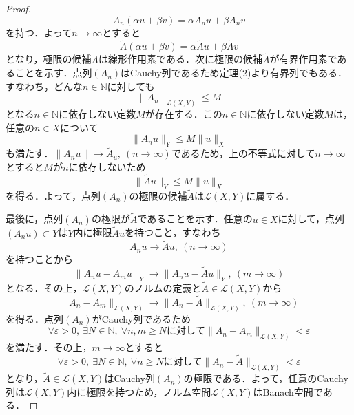 \documentclass[11pt,a4paper,titlepage]{jsreport}
\theoremstyle{definition}
\begin{document}
\begin{proof}
  \begin{equation*}
    A_n(\alpha u+\beta v) = \alpha A_n u + \beta A_n v
  \end{equation*}
  を持つ．よって$n\rightarrow \infty$とすると
  \begin{equation*}
    \tilde{A}(\alpha u+\beta v)=\alpha \tilde{A} u + \beta \tilde{A} v
  \end{equation*}
  となり，極限の候補$\tilde{A}$は線形作用素である．次に極限の候補$\tilde{A}$が有界作用素であることを示す．点列$(A_n)$はCauchy列であるため定理(2)より有界列でもある．すなわち，どんな$n\in \mathbb{N}$に対しても
  \begin{equation*}
    \|A_n\|_{\mathcal{L}(X,Y)} \leq M
  \end{equation*}
  となる$n\in\mathbb{N}$に依存しない定数$M$が存在する．この$n\in\mathbb{N}$に依存しない定数$M$は，任意の$n\in X$について
  \begin{equation*}
    \|A_nu\|_Y \leq M\|u\|_X
  \end{equation*}
  も満たす．$\|A_nu\|\rightarrow\tilde{A}_u,\ (n\rightarrow \infty)$であるため，上の不等式に対して$n\rightarrow \infty$とすると$M$が$n$に依存しないため
  \begin{equation*}
    \|\tilde{A}u\|_Y \leq M\|u\|_X
  \end{equation*}
  を得る．よって，点列$(A_n)$の極限の候補$\tilde{A}$は$\mathcal{L}(X,Y)$に属する．

  最後に，点列$(A_n)$の極限が$\tilde{A}$であることを示す．任意の$u\in X$に対して，点列$(A_nu)\subset Y$は$Y$内に極限$\tilde{A}u$を持つこと，すなわち
  \begin{equation*}
    A_nu\rightarrow \tilde{A}u,\ (n \rightarrow \infty)
  \end{equation*}
  を持つことから
  \begin{equation*}
    \|A_n u- A_m u\|_Y\rightarrow \|A_n u-\tilde{A}u\|_Y,\ (m\rightarrow \infty)
  \end{equation*}
  となる．その上，$\mathcal{L}(X,Y)$のノルムの定義と$\tilde{A}\in\mathcal{L}(X,Y)$から
  \begin{equation*}
    \|A_n-A_m\|_{\mathcal{L}(X,Y)}\rightarrow\|A_n-\tilde{A}\|_{\mathcal{L}(X,Y)},\ (m\rightarrow \infty)
  \end{equation*}
  を得る．点列$(A_n)$がCauchy列であるため
  \begin{equation*}
    \forall \varepsilon >0,\ \exists N\in\mathbb{N},\ \forall n,m\geq N に対して\|A_n-A_m\|_{\mathcal{L}(X,Y)}<\varepsilon
  \end{equation*}
  を満たす．その上，$m\rightarrow \infty$とすると
  \begin{equation*}
    \forall \varepsilon >0,\ \exists N\in\mathbb{N},\ \forall n\geq N に対して\|A_n-\tilde{A}\|_{\mathcal{L}(X,Y)}<\varepsilon
  \end{equation*}
  となり，$\tilde{A}\in\mathcal{L}(X,Y)$はCauchy列$(A_n)$の極限である．よって，任意のCauchy列は$\mathcal{L}(X,Y)$内に極限を持つため，ノルム空間$\mathcal{L}(X,Y)$はBanach空間である．
\end{proof}
\end{document}
